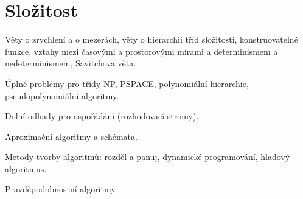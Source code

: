 \newpage
\section{Složitost}
\begin{pozadavky}
\begin{pitemize}
\item Věty o zrychlení a o mezerách, věty o hierarchii tříd složitosti, konstruovatelné funkce, vztahy mezi časovými a prostorovými mírami a determinismem a nedeterminismem, Savitchova věta. 
\item Úplné problémy pro třídy NP, PSPACE, polynomiální hierarchie, pseudopolynomiální algoritmy. 
\item Dolní odhady pro uspořádání (rozhodovací stromy). 
\item Aproximační algoritmy a schémata. 
\item Metody tvorby algoritmů: rozděl a panuj, dynamické programování, hladový algoritmus. 
\item Pravděpodobnostní algoritmy.
\end{pitemize}
\end{pozadavky}







